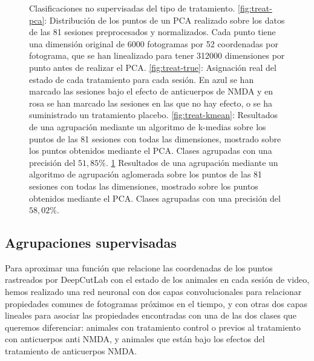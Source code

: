 \begin{figure}[p]
\begin{subfigure}{0.45\textwidth}
    \caption{}
    \label{fig:treat-agg}
  \end{subfigure}
  \caption[Clasificación no supervisada de tratamiento.]{Clasificaciones no supervisadas del tipo de tratamiento. \ref{fig:treat-pca}: Distribución de los puntos de un PCA realizado sobre los datos de las 81 sesiones preprocesados y normalizados. Cada punto tiene una dimensión original de 6000 fotogramas por 52 coordenadas por fotograma, que se han linealizado para tener 312000 dimensiones por punto antes de realizar el PCA. \ref{fig:treat-true}: Asignación real del estado de cada tratamiento para cada sesión. En azul se han marcado las sesiones bajo el efecto de anticuerpos de NMDA y en rosa se han marcado las sesiones en las que no hay efecto, o se ha suministrado un tratamiento placebo. \ref{fig:treat-kmean}: Resultados de una agrupación mediante un algoritmo de k-medias sobre los puntos de las 81 sesiones con todas las dimensiones, mostrado sobre los puntos obtenidos mediante el PCA. Clases agrupadas con una precisión del $ 51,85\% $. \ref{fig:treat-agg} Resultados de una agrupación mediante un algoritmo de agrupación aglomerada sobre los puntos de las 81 sesiones con todas las dimensiones, mostrado sobre los puntos obtenidos mediante el PCA. Clases agrupadas con una precisión del $ 58,02\% $.}
  \label{fig:unsupervied-treatment}
\end{figure}



\subsection{Agrupaciones supervisadas}

Para aproximar una función que relacione las coordenadas de los puntos rastreados por DeepCutLab con el estado de los animales en cada sesión de video, hemos realizado una red neuronal con dos capas convolucionales para relacionar propiedades comunes de fotogramas próximos en el tiempo, y con otras dos capas lineales para asociar las propiedades encontradas con una de las dos clases que queremos diferenciar: animales con tratamiento control o previos al tratamiento con anticuerpos anti NMDA, y animales que están bajo los efectos del tratamiento de anticuerpos NMDA.

